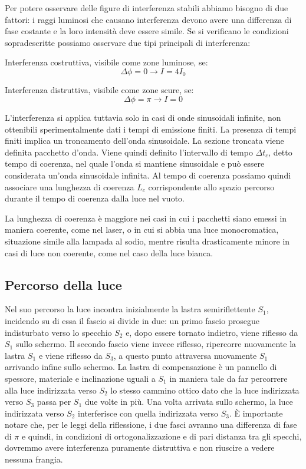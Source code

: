 \documentclass{article}
\begin{document}
Per potere osservare delle figure di interferenza stabili abbiamo bisogno di due fattori: i raggi luminosi che causano interferenza devono avere una differenza di fase costante e la loro intensità deve essere simile. Se si verificano le condizioni sopradescritte possiamo osservare due tipi principali di interferenza:

Interferenza costruttiva, visibile come zone luminose, se:
\[ \Delta \phi = 0 \rightarrow I = 4 I_0 \]

Interferenza distruttiva, visibile come zone scure, se: 
\[ \Delta \phi = \pi \rightarrow I = 0 \]

L'interferenza si applica tuttavia solo in casi di onde sinusoidali infinite, non ottenibili sperimentalmente dati i tempi di emissione finiti. La presenza di tempi finiti implica un troncamento dell'onda sinusoidale. La sezione troncata viene definita pacchetto d'onda. Viene quindi definito l'intervallo di tempo $\Delta t_c$, detto tempo di coerenza, nel quale l'onda si mantiene sinusoidale e può essere considerata un'onda sinusoidale infinita. Al tempo di coerenza possiamo quindi associare una lunghezza di coerenza $L_c$ corrispondente allo spazio percorso durante il tempo di coerenza dalla luce nel vuoto.

La lunghezza di coerenza è maggiore nei casi in cui i pacchetti siano emessi in maniera coerente, come nel laser, o in cui si abbia una luce monocromatica, situazione simile alla lampada al sodio, mentre risulta drasticamente minore in casi di luce non coerente, come nel caso della luce bianca.


\subsection{Percorso della luce}


Nel suo percorso la luce incontra inizialmente la lastra semiriflettente $S_1$, incidendo su di essa il fascio si divide in due: un primo fascio prosegue indisturbato verso lo specchio $S_2$ e, dopo essere tornato indietro, viene riflesso da $S_1$ sullo schermo. Il secondo fascio viene invece riflesso, ripercorre nuovamente la lastra $S_1$ e viene riflesso da $S_3$, a questo punto attraversa nuovamente $S_1$ arrivando infine sullo schermo. La lastra di compensazione è un pannello di spessore, materiale e inclinazione uguali a $S_1$ in maniera tale da far percorrere alla luce indirizzata verso $S_2$ lo stesso cammino ottico dato che la luce indirizzata verso $S_3$ passa per $S_1$ due volte in più.
Una volta arrivata sullo schermo, la luce indirizzata verso $S_2$ interferisce con quella indirizzata verso $S_3$. È importante notare che, per le leggi della riflessione, i due fasci avranno una differenza di fase di $\pi$ e quindi, in condizioni di ortogonalizzazione e di pari distanza tra gli specchi, dovremmo avere interferenza puramente distruttiva e non riuscire a vedere nessuna frangia.
\end{document}
